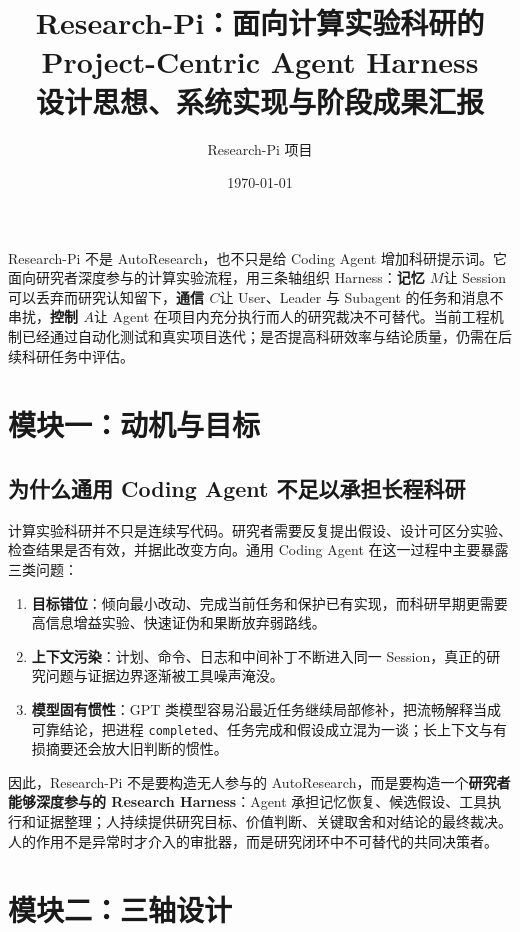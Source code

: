 \documentclass[UTF8,11pt,a4paper,fontset=fandol]{ctexart}
\title{\bfseries Research-Pi：面向计算实验科研的\\Project-Centric Agent Harness\\\large 设计思想、系统实现与阶段成果汇报}
\author{Research-Pi 项目}
\date{\today}
\newcommand{\code}[1]{\texttt{#1}}
\newcommand{\term}[1]{\textbf{#1}}
\begin{document}
\maketitle

\begin{resultbox}[结论先行]
Research-Pi 不是 AutoResearch，也不只是给 Coding Agent 增加科研提示词。它面向研究者深度参与的计算实验流程，用三条轴组织 Harness：\term{记忆 $M$}让 Session 可以丢弃而研究认知留下，\term{通信 $C$}让 User、Leader 与 Subagent 的任务和消息不串扰，\term{控制 $A$}让 Agent 在项目内充分执行而人的研究裁决不可替代。当前工程机制已经通过自动化测试和真实项目迭代；是否提高科研效率与结论质量，仍需在后续科研任务中评估。
\end{resultbox}

\setcounter{tocdepth}{2}
\tableofcontents
\newpage

\section{模块一：动机与目标}

\subsection{为什么通用 Coding Agent 不足以承担长程科研}

计算实验科研并不只是连续写代码。研究者需要反复提出假设、设计可区分实验、检查结果是否有效，并据此改变方向。通用 Coding Agent 在这一过程中主要暴露三类问题：

\begin{enumerate}
  \item \term{目标错位}：倾向最小改动、完成当前任务和保护已有实现，而科研早期更需要高信息增益实验、快速证伪和果断放弃弱路线。
  \item \term{上下文污染}：计划、命令、日志和中间补丁不断进入同一 Session，真正的研究问题与证据边界逐渐被工具噪声淹没。
  \item \term{模型固有惯性}：GPT 类模型容易沿最近任务继续局部修补，把流畅解释当成可靠结论，把进程 \code{completed}、任务完成和假设成立混为一谈；长上下文与有损摘要还会放大旧判断的惯性。
\end{enumerate}

因此，Research-Pi 不是要构造无人参与的 AutoResearch，而是要构造一个\term{研究者能够深度参与的 Research Harness}：Agent 承担记忆恢复、候选假设、工具执行和证据整理；人持续提供研究目标、价值判断、关键取舍和对结论的最终裁决。人的作用不是异常时才介入的审批器，而是研究闭环中不可替代的共同决策者。

\section{模块二：三轴设计}
\end{document}
